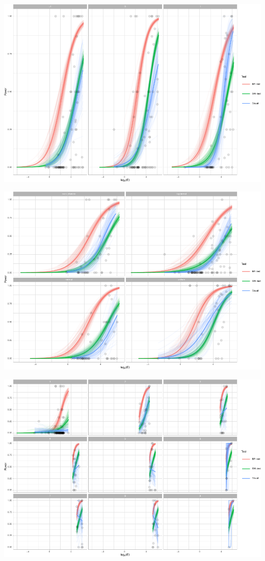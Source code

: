 \documentclass[]{interact}
\theoremstyle{plain}%
\theoremstyle{definition}
\theoremstyle{remark}
\begin{document}
\includegraphics{paper_comparison_files/figure-latex/unnamed-chunk-16-1.pdf}

\includegraphics{paper_comparison_files/figure-latex/unnamed-chunk-17-1.pdf}

\includegraphics{paper_comparison_files/figure-latex/unnamed-chunk-18-1.pdf}
\end{document}
